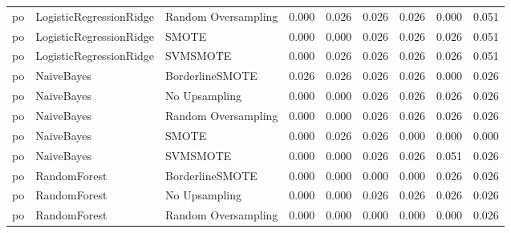 \begin{tabular}{lllllllll}
      po &      LogisticRegressionRidge & Random Oversampling & 0.000 &                     0.026 &                 0.026 &                  0.026 &                                   0.000 &     0.051 \\
      po &      LogisticRegressionRidge &               SMOTE & 0.000 &                     0.000 &                 0.026 &                  0.026 &                                   0.026 &     0.051 \\
      po &      LogisticRegressionRidge &            SVMSMOTE & 0.000 &                     0.026 &                 0.026 &                  0.026 &                                   0.026 &     0.051 \\
      po &                   NaiveBayes &     BorderlineSMOTE & 0.026 &                     0.026 &                 0.026 &                  0.026 &                                   0.000 &     0.026 \\
      po &                   NaiveBayes &       No Upsampling & 0.000 &                     0.000 &                 0.026 &                  0.026 &                                   0.026 &     0.026 \\
      po &                   NaiveBayes & Random Oversampling & 0.000 &                     0.000 &                 0.026 &                  0.026 &                                   0.026 &     0.026 \\
      po &                   NaiveBayes &               SMOTE & 0.000 &                     0.026 &                 0.026 &                  0.000 &                                   0.000 &     0.000 \\
      po &                   NaiveBayes &            SVMSMOTE & 0.000 &                     0.000 &                 0.026 &                  0.026 &                                   0.051 &     0.026 \\
      po &                 RandomForest &     BorderlineSMOTE & 0.000 &                     0.000 &                 0.000 &                  0.000 &                                   0.026 &     0.026 \\
      po &                 RandomForest &       No Upsampling & 0.000 &                     0.000 &                 0.026 &                  0.026 &                                   0.026 &     0.026 \\
      po &                 RandomForest & Random Oversampling & 0.000 &                     0.000 &                 0.000 &                  0.000 &                                   0.000 &     0.026 \\

\end{tabular}
